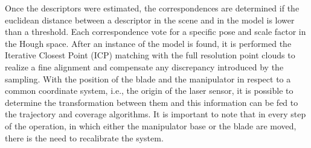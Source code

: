 Once the descriptors were estimated, the correspondences are determined if the
euclidean distance between a descriptor in the scene and in the model is lower
than a threshold. Each correspondence vote for a specific pose and scale factor in the
Hough space. After an instance of the model is found, it is performed the 
Iterative Closest Point (ICP) matching with the full resolution point clouds to
realize a fine alignment and compensate any discrepancy introduced by the
sampling. With the position of the blade and the manipulator in respect to a
common coordinate system, i.e., the origin of the laser sensor, it is possible
to determine the transformation between them and this information can be fed to
the trajectory and coverage algorithms. It is important to note that in every
step of the operation, in which either the manipulator base or the blade are
moved, there is the need to recalibrate the system.



